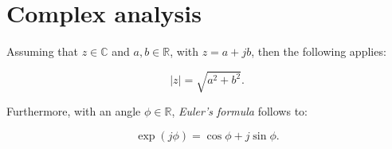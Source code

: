 \section{Complex analysis} \label{sec:complex_analysis}
Assuming that $z \in \mathbb{C}$ and $a,b \in \mathbb{R}$, with $z = a + jb$, then the following applies: 
\begin{center}
	\begin{equation} \label{eq:abs_value}
		\left|z\right| = \sqrt{a^2+b^2}\text{.}
	\end{equation}
\end{center}
Furthermore, with an angle $\phi \in \mathbb{R}$, \emph{Euler's formula} follows to:
\begin{center}
	\begin{equation} \label{eq:euler}
		\exp\left(j\phi\right) = \cos \phi + j \sin \phi\text{.}
	\end{equation}
\end{center}